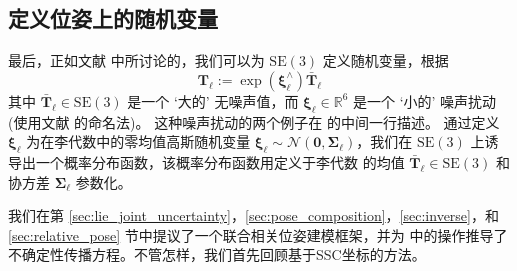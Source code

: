 \subsection{定义位姿上的随机变量}

最后，正如文献 \cite{barfoot2014associating} 中所讨论的，我们可以为 $\mathrm{SE}(3)$ 定义随机变量，根据 
\begin{equation}
    \mathbf{T}_\ell := \operatorname{exp}(\boldsymbol{\xi}_\ell^{\wedge}) \bar{\mathbf{T}}_\ell
    \label{eq:T_i}
\end{equation}
其中 $\bar{\mathbf{T}}_\ell\in \mathrm{SE}(3)$ 是一个 `大的' 无噪声值，而 $\boldsymbol{\xi}_\ell \in \mathbb{R}^6$ 是一个 `小的' 噪声扰动 (使用文献 \cite{barfoot2014associating} 的命名法)。
这种噪声扰动的两个例子在  的中间一行描述。 
通过定义 $\boldsymbol{\xi}_\ell$ 为在李代数中的零均值高斯随机变量 $\boldsymbol{\xi}_\ell \sim \mathcal{N}(\mathbf{0}, \boldsymbol{\Sigma}_\ell)$，我们在 $\mathrm{SE}(3)$ 上诱导出一个概率分布函数，该概率分布函数用定义于李代数 \cite{barfoot2014associating} 的均值 $\bar{\mathbf{T}}_\ell \in \mathrm{SE}(3)$ 和协方差 $\boldsymbol{\Sigma}_\ell$ 参数化。 

我们在第 \ref{sec:lie_joint_uncertainty}，\ref{sec:pose_composition}，\ref{sec:inverse}，和 \ref{sec:relative_pose} 节中提议了一个联合相关位姿建模框架，并为  中的操作推导了不确定性传播方程。不管怎样，我们首先回顾基于SSC坐标的方法。 

